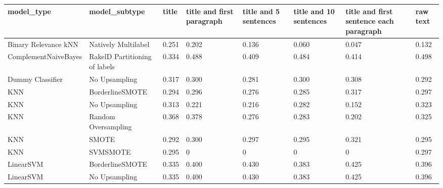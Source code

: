 \begin{tabular}{llllllll}
\toprule
                     model\_type &                 model\_subtype & title & title and first paragraph & title and 5 sentences & title and 10 sentences & title and first sentence each paragraph & raw text \\
\midrule
           Binary Relevance kNN &           Natively Multilabel & 0.251 &                     0.202 &                 0.136 &                  0.060 &                                   0.047 &    0.132 \\
           ComplementNaiveBayes & RakelD Partitioning of labels & 0.334 &                     0.488 &                 0.409 &                  0.484 &                                   0.414 &    0.498 \\
               Dummy Classifier &                 No Upsampling & 0.317 &                     0.300 &                 0.281 &                  0.300 &                                   0.308 &    0.292 \\
                            KNN &               BorderlineSMOTE & 0.294 &                     0.296 &                 0.276 &                  0.285 &                                   0.317 &    0.297 \\
                            KNN &                 No Upsampling & 0.313 &                     0.221 &                 0.216 &                  0.282 &                                   0.152 &    0.323 \\
                            KNN &           Random Oversampling & 0.368 &                     0.378 &                 0.276 &                  0.283 &                                   0.202 &    0.325 \\
                            KNN &                         SMOTE & 0.292 &                     0.300 &                 0.297 &                  0.295 &                                   0.321 &    0.295 \\
                            KNN &                      SVMSMOTE & 0.295 &                         0 &                     0 &                      0 &                                       0 &    0.297 \\
                      LinearSVM &               BorderlineSMOTE & 0.335 &                     0.400 &                 0.430 &                  0.383 &                                   0.425 &    0.396 \\
                      LinearSVM &                 No Upsampling & 0.335 &                     0.400 &                 0.430 &                  0.383 &                                   0.425 &    0.396 \\

\end{tabular}
